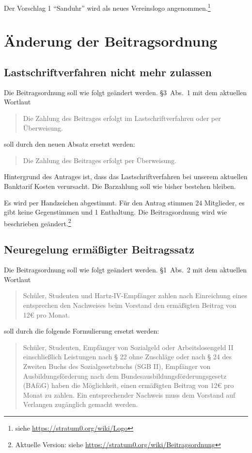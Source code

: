 \documentclass[a4paper,12pt]{scrartcl}
\begin{document}
Der Vorschlag 1 "`Sanduhr"' wird als neues Vereinslogo angenommen.\footnote{%
siehe \url{https://stratum0.org/wiki/Logo}}


\section{Änderung der Beitragsordnung}
\subsection{Lastschriftverfahren nicht mehr zulassen}
Die Beitragsordnung soll wie folgt geändert werden. §3~Abs.~1 mit dem aktuellen
Wortlaut
\begin{quote}
  Die Zahlung des Beitrages erfolgt im Lastschriftverfahren oder per
  Überweisung.
\end{quote}
soll durch den neuen Absatz ersetzt werden:
\begin{quote}
  Die Zahlung des Beitrages erfolgt per Überweisung.
\end{quote}

Hintergrund des Antrages ist, dass das Lastschriftverfahren bei unserem
aktuellen Banktarif Kosten verursacht. Die Barzahlung soll wie bisher bestehen
bleiben.

Es wird per Handzeichen abgestimmt. Für den Antrag stimmen 24 Mitglieder, es
gibt keine Gegenstimmen und 1 Enthaltung. Die Beitragsordnung wird wie
beschrieben geändert.\footnote{Aktuelle Version: siehe
\url{https://stratum0.org/wiki/Beitragsordnung}}\saveFN\FNUrlBeitrO

\subsection{Neuregelung ermäßigter Beitragssatz}
Die Beitragsordnung soll wie folgt geändert werden. §1~Abs.~2 mit dem aktuellen
Wortlaut
\begin{quote}
  Schüler, Studenten und Hartz-IV-Empfänger zahlen nach Einreichung eines
  entsprechen den Nachweises beim Vorstand den ermäßigten Beitrag von 12€ pro
  Monat.
\end{quote}
soll durch die folgende Formulierung ersetzt werden:
\begin{quote}
  Schüler, Studenten, Empfänger von Sozialgeld oder Arbeitslosengeld II
  einschließlich Leistungen nach § 22 ohne Zuschläge oder nach § 24 des Zweiten
  Buchs des Sozialgesetzbuchs (SGB II), Empfänger von Ausbildungsförderung nach
  dem Bundesausbildungsförderungsgesetz (BAföG) haben die Möglichkeit, einen
  ermäßigten Beitrag von 12€ pro Monat zu zahlen. Ein entsprechender Nachweis
  muss dem Vorstand auf Verlangen zugänglich gemacht werden.
\end{quote}
\end{document}
